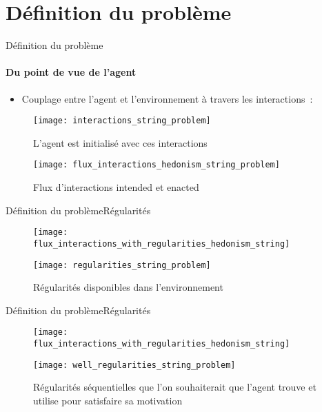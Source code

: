 \documentclass{beamer}
\begin{document}
\section{Définition du problème}
\begin{frame}{Définition du problème}
\framesubtitle{Du point de vue de l'agent}
\begin{itemize}
\item Couplage entre l'agent et l'environnement à travers les interactions~:
\end{itemize}
\begin{figure}
\centering
\texttt{[image: interactions\_string\_problem]}
\caption{L'agent est initialisé avec ces interactions}
\label{fig:listInteraction}
\end{figure}

\begin{figure}
\centering
\texttt{[image: flux\_interactions\_hedonism\_string\_problem]}
\caption{Flux d'interactions intended et enacted}
\label{fig:interactions_flux}
\end{figure}
\end{frame}


\begin{frame}{Définition du problème}{Régularités}
\begin{figure}
	\centering
	\texttt{[image: flux\_interactions\_with\_regularities\_hedonism\_string]}
\end{figure}
\begin{figure}
	\centering
	\texttt{[image: regularities\_string\_problem]}
	\caption{Régularités disponibles dans l'environnement}
\end{figure}
\end{frame}
\begin{frame}{Définition du problème}{Régularités}
	\begin{figure}
		\centering
		\texttt{[image: flux\_interactions\_with\_regularities\_hedonism\_string]}
	\end{figure}
\begin{figure}
	\centering
	\texttt{[image: well\_regularities\_string\_problem]}
	\caption{Régularités séquentielles que l'on souhaiterait que l'agent trouve et utilise pour satisfaire sa motivation}
\end{figure}
\end{frame}
\end{document}
